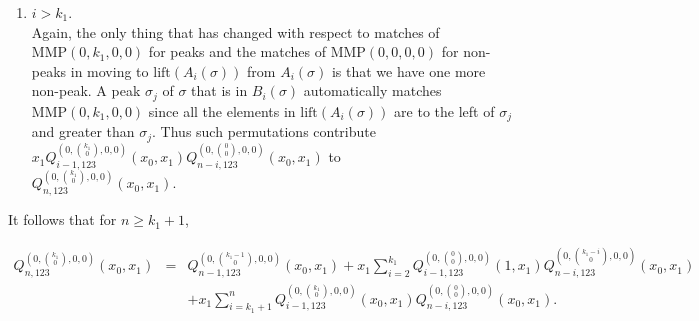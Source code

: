\documentclass[
final,nomarks
]{dmtcs-episciences}
\newcommand{\lift}{\mathrm{lift}}
\newcommand{\Qmzn}[3]{Q_{#3,123}^{(0,\binom{#1}{#2},0,0)}(x_0,x_1)}
\newcommand{\MMP}{\mathrm{MMP}}
\begin{document}
\begin{enumerate}[{\bf Case }\bf 1.]
	\item \begin{math}i >  k_1\end{math}.\\
	Again, the only thing that has changed with respect to matches of \begin{math}\MMP(0,k_1,0,0)\end{math} 
	for peaks and the matches of \begin{math}\MMP(0,0,0,0)\end{math} for non-peaks in moving  
	to \begin{math}\mathrm{lift}(A_i(\sigma))\end{math} from \begin{math}A_i(\sigma)\end{math} is that we have one more non-peak.
	A peak \begin{math}\sigma_j\end{math} of \begin{math}\sigma\end{math} that is in \begin{math}B_i(\sigma)\end{math} automatically matches 
	\begin{math}\MMP(0,k_1,0,0)\end{math} since all the elements in \begin{math}\lift(A_i(\sigma))\end{math} are to the left of \begin{math}\sigma_j\end{math} 
	and greater than \begin{math}\sigma_j\end{math}. Thus such permutations 
	contribute \begin{math}x_1\Qmzn{k_1}{0}{i-1}\Qmzn{0}{0}{n-i}\end{math}  to\\ \begin{math}\Qmzn{k_1}{0}{n}\end{math}.
	
\end{enumerate}

It follows that for \begin{math}n \geq k_1 +1\end{math}, 


\begin{eqnarray}
	\Qmzn{k_1}{0}{n}&=&\Qmzn{k_1-1}{0}{n-1}+x_1\sum_{i=2}^{k_1}
	Q_{i-1,123}^{(0,\binom{0}{0},0,0)}(1,x_1)\Qmzn{k_1-i}{0}{n-i}\nonumber\\
	&&+x_1\sum_{i=k_1+1}^{n}\Qmzn{k_1}{0}{i-1}\Qmzn{0}{0}{n-i}. 
\end{eqnarray}
\end{document}
